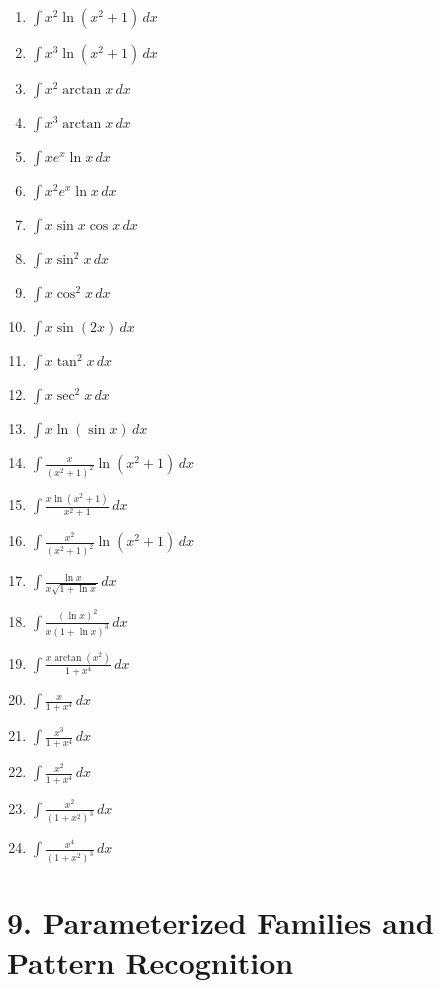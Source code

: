 \documentclass[11pt]{article}
\begin{document}
\begin{enumerate}
\item $\displaystyle \int x^2\ln(x^2+1)\,dx$
\item $\displaystyle \int x^3\ln(x^2+1)\,dx$
\item $\displaystyle \int x^2\arctan x\,dx$
\item $\displaystyle \int x^3\arctan x\,dx$
\item $\displaystyle \int x e^x\ln x\,dx$
\item $\displaystyle \int x^2 e^x\ln x\,dx$
\item $\displaystyle \int x\sin x\cos x\,dx$
\item $\displaystyle \int x\sin^2x\,dx$
\item $\displaystyle \int x\cos^2x\,dx$
\item $\displaystyle \int x\sin(2x)\,dx$
\item $\displaystyle \int x\tan^2x\,dx$
\item $\displaystyle \int x\sec^2x\,dx$
\item $\displaystyle \int x\ln(\sin x)\,dx$
\item $\displaystyle \int \frac{x}{(x^2+1)^2}\ln(x^2+1)\,dx$
\item $\displaystyle \int \frac{x\ln(x^2+1)}{x^2+1}\,dx$
\item $\displaystyle \int \frac{x^2}{(x^2+1)^2}\ln(x^2+1)\,dx$
\item $\displaystyle \int \frac{\ln x}{x\sqrt{1+\ln x}}\,dx$
\item $\displaystyle \int \frac{(\ln x)^2}{x(1+\ln x)^3}\,dx$
\item $\displaystyle \int \frac{x\arctan(x^2)}{1+x^4}\,dx$
\item $\displaystyle \int \frac{x}{1+x^4}\,dx$
\item $\displaystyle \int \frac{x^3}{1+x^4}\,dx$
\item $\displaystyle \int \frac{x^2}{1+x^4}\,dx$
\item $\displaystyle \int \frac{x^2}{(1+x^2)^3}\,dx$
\item $\displaystyle \int \frac{x^4}{(1+x^2)^3}\,dx$
\end{enumerate}

\section*{9. Parameterized Families and Pattern Recognition}
\end{document}
